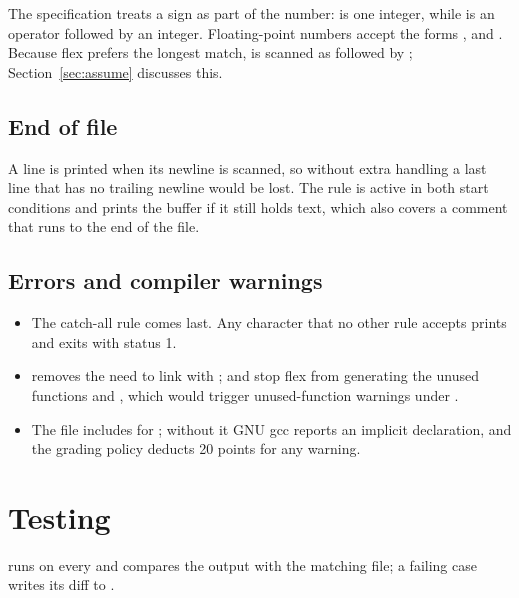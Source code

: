 \documentclass[12pt]{article}
\begin{document}
The specification treats a sign as part of the number:  is one integer, while  is an
operator followed by an integer. Floating-point numbers accept the forms ,  and
. Because flex prefers the longest match,  is scanned as  followed by
; Section~\ref{sec:assume} discusses this.

\subsection{End of file}


A line is printed when its newline is scanned, so without extra handling a last line that has no
trailing newline would be lost. The  rule is active in both start conditions and prints the
buffer if it still holds text, which also covers a comment that runs to the end of the file.

\subsection{Errors and compiler warnings}


\begin{itemize}
  \item The catch-all rule  comes last. Any character that no other rule accepts prints
         and exits with status 1.
  \item {} removes the need to link with ;  and
         stop flex from generating the unused functions  and ,
        which would trigger unused-function warnings under .
  \item The file includes  for ; without it GNU gcc reports an implicit
        declaration, and the grading policy deducts 20 points for any warning.
\end{itemize}

\section{Testing}

 runs  on every  and compares the output with the
matching  file; a failing case writes its diff to .
\end{document}
